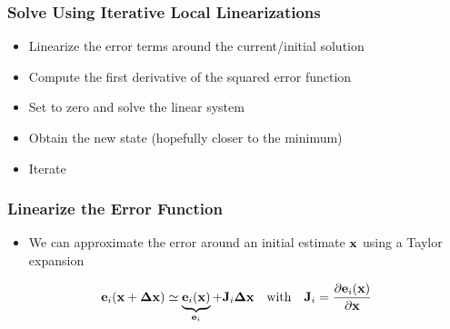 \begin{frame}
    \frametitle{Solve Using Iterative Local Linearizations}
    \begin{itemize}
        \item Linearize the error terms around the current/initial solution
        \item Compute the first derivative of the squared error function
        \item Set to zero and solve the linear system
        \item Obtain the new state (hopefully closer to the minimum)
        \item Iterate
    \end{itemize}
\end{frame}

\begin{frame}
    \frametitle{Linearize the Error Function}
    
    \begin{itemize}
        \item We can approximate the error around an initial estimate $\boldsymbol{\mathbf{x}}$ using a Taylor expansion
    \end{itemize}
    
    \begin{equation*}
        \boldsymbol{\mathbf{e}}_{i}(\boldsymbol{\mathbf{x}} + \boldsymbol{\mathbf{\Delta}}\boldsymbol{\mathbf{x}}) \simeq  \underbrace{\boldsymbol{\mathbf{e}}_{i}(\boldsymbol{\mathbf{x}})}_{\boldsymbol{\mathbf{e}}_{i}} + \boldsymbol{\mathbf{J}}_{i}\boldsymbol{\mathbf{\Delta}}\boldsymbol{\mathbf{x}} \quad \text{with} \quad \boldsymbol{\mathbf{J}}_{i} = \dfrac{\partial\boldsymbol{\mathbf{e}}_{i}(\boldsymbol{\mathbf{x}})}{\partial\boldsymbol{\mathbf{x}}}
    \end{equation*}
    
\end{frame}

